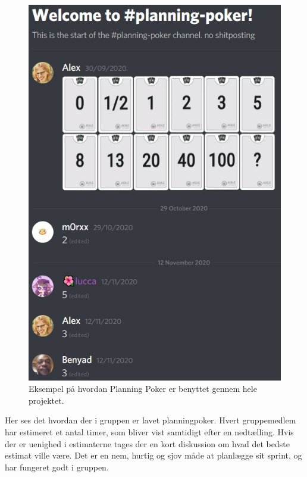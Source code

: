 \begin{figure}
    \includegraphics[width=\linewidth,scale=0.5]{figures/planningpoker.jpg}
    \caption{Eksempel på hvordan Planning Poker er benyttet gennem hele projektet.}
    \label{fig:Poker}
\end{figure}
Her ses det hvordan der i gruppen er lavet planningpoker. Hvert gruppemedlem har estimeret et antal timer, som bliver vist samtidigt efter en nedtælling. Hvis der er uenighed i estimaterne tages der en kort diskussion om hvad det bedste estimat ville være. Det er en nem, hurtig og sjov måde at planlægge sit sprint, og har fungeret godt i gruppen.
